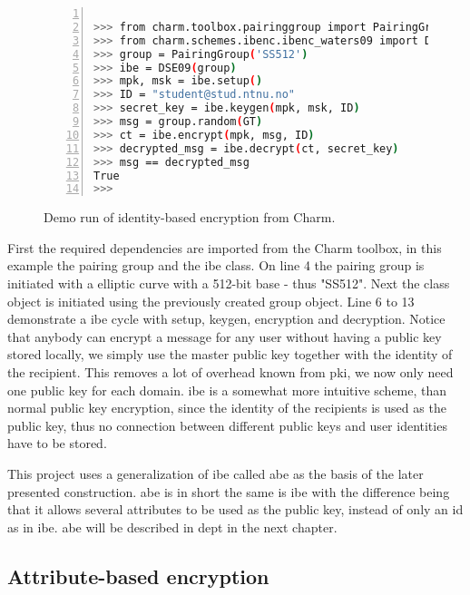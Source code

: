 \begin{figure}[H]
\begin{lstlisting}[language=bash, xleftmargin=2em, frame=single, framexleftmargin=1.5em, breaklines=true, numbers=left, numbersep=5pt, numberstyle=\tiny\color{mygray}]

>>> from charm.toolbox.pairinggroup import PairingGroup, GT
>>> from charm.schemes.ibenc.ibenc_waters09 import DSE09
>>> group = PairingGroup('SS512')
>>> ibe = DSE09(group)
>>> mpk, msk = ibe.setup()
>>> ID = "student@stud.ntnu.no"
>>> secret_key = ibe.keygen(mpk, msk, ID)
>>> msg = group.random(GT)
>>> ct = ibe.encrypt(mpk, msg, ID)
>>> decrypted_msg = ibe.decrypt(ct, secret_key)
>>> msg == decrypted_msg
True
>>> 

\end{lstlisting}
\caption{Demo run of identity-based encryption from Charm.}
\label{fig:ibenc}
\end{figure}

First the required dependencies are imported from the Charm toolbox, in this example the pairing group and the \gls{ibe} class. On line 4 the pairing group is initiated with a elliptic curve with a 512-bit base - thus "SS512". Next the class object is initiated using the previously created group object. Line 6 to 13 demonstrate a \gls{ibe} cycle with setup, keygen, encryption and decryption.
Notice that anybody can encrypt a message for any user without having a public key stored locally, we simply use the master public key together with the identity of the recipient. This removes a lot of overhead known from \gls{pki}, we now only need one public key for each domain. \Gls{ibe} is a somewhat more intuitive scheme, than normal public key encryption, since the identity of the recipients is used as the public key, thus no connection between different public keys and user identities have to be stored.
\par This project uses a generalization of \gls{ibe} called \gls{abe} as the basis of the later presented construction. \Gls{abe} is in short the same is \gls{ibe} with the difference being that it allows several attributes to be used as the public key, instead of only an id as in \gls{ibe}. \Gls{abe} will be described in dept in the next chapter.

\subsection{Attribute-based encryption}\label{subsec:ABE}

